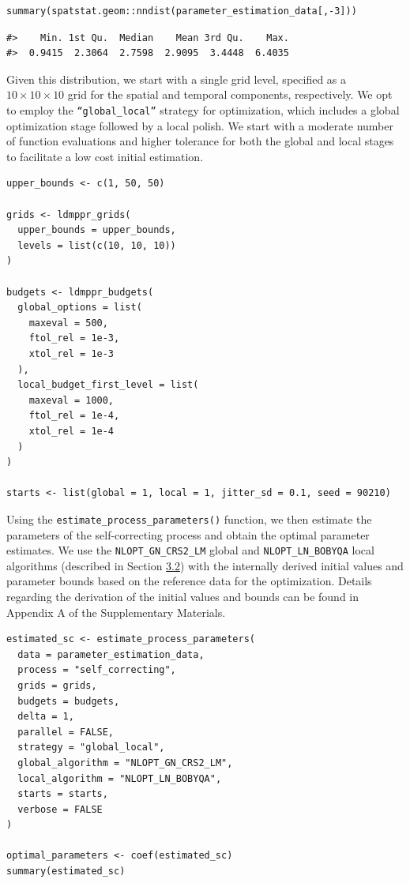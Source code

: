 \begin{verbatim}
summary(spatstat.geom::nndist(parameter_estimation_data[,-3]))
\end{verbatim}

\begin{verbatim}
#>    Min. 1st Qu.  Median    Mean 3rd Qu.    Max. 
#>  0.9415  2.3064  2.7598  2.9095  3.4448  6.4035
\end{verbatim}

{Given this distribution, we start with a single grid level, specified as a \(10 \times 10 \times 10\) grid for the spatial and temporal components, respectively. We opt to employ the \texttt{“global\_local”} strategy for optimization, which includes a global optimization stage followed by a local polish. We start with a moderate number of function evaluations and higher tolerance for both the global and local stages to facilitate a low cost initial estimation.}

\begin{verbatim}
upper_bounds <- c(1, 50, 50)

grids <- ldmppr_grids(
  upper_bounds = upper_bounds,
  levels = list(c(10, 10, 10))
)

budgets <- ldmppr_budgets(
  global_options = list(
    maxeval = 500,
    ftol_rel = 1e-3,
    xtol_rel = 1e-3
  ),
  local_budget_first_level = list(
    maxeval = 1000,
    ftol_rel = 1e-4,
    xtol_rel = 1e-4
  )
)

starts <- list(global = 1, local = 1, jitter_sd = 0.1, seed = 90210)
\end{verbatim}

{Using the \texttt{estimate\_process\_parameters()} function, we then estimate the parameters of the self-correcting process and obtain the optimal parameter estimates. We use the \texttt{NLOPT\_GN\_CRS2\_LM} global and \texttt{NLOPT\_LN\_BOBYQA} local algorithms (described in Section \hyperref[scestimation]{3.2}) with the internally derived initial values and parameter bounds based on the reference data for the optimization. Details regarding the derivation of the initial values and bounds can be found in Appendix A of the Supplementary Materials.}

\begin{verbatim}
estimated_sc <- estimate_process_parameters(
  data = parameter_estimation_data,
  process = "self_correcting",
  grids = grids,
  budgets = budgets,
  delta = 1,
  parallel = FALSE,
  strategy = "global_local",
  global_algorithm = "NLOPT_GN_CRS2_LM",
  local_algorithm = "NLOPT_LN_BOBYQA",
  starts = starts,
  verbose = FALSE
)

optimal_parameters <- coef(estimated_sc)
summary(estimated_sc)
\end{verbatim}

